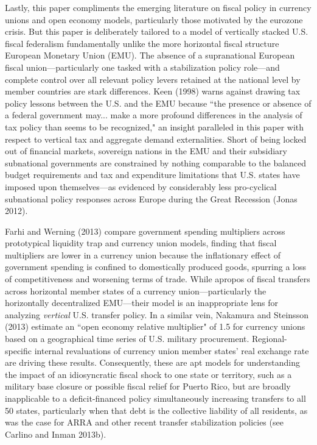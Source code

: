 \documentclass[12pt,letterpaper]{article}
\begin{document}
Lastly, this paper compliments the emerging literature on fiscal policy in currency unions and open economy models, particularly those motivated by the eurozone crisis. But this paper is deliberately tailored to a model of vertically stacked U.S. fiscal federalism fundamentally unlike the more horizontal fiscal structure European Monetary Union (EMU). The absence of a supranational European fiscal union---particularly one tasked with a stabilization policy role---and complete control over all relevant policy levers retained at the national level by member countries are stark differences. Keen (1998) warns against drawing tax policy lessons between the U.S. and the EMU because ``the presence or absence of a federal government may... make a more profound differences in the analysis of tax policy than seems to be recognized," an insight paralleled in this paper with respect to vertical tax and aggregate demand externalities. Short of being locked out of financial markets, sovereign nations in the EMU and their subsidiary subnational governments are constrained by nothing comparable to the balanced budget requirements and tax and expenditure limitations that U.S. states have imposed upon themselves---as evidenced by  considerably less pro-cyclical subnational policy responses across Europe during the Great Recession (Jonas 2012).

Farhi and Werning (2013) compare government spending multipliers across prototypical liquidity trap and currency union models, finding that fiscal multipliers are lower in a currency union because the inflationary effect of government spending is confined to domestically produced goods, spurring a loss of competitiveness and worsening terms of trade. While apropos of fiscal transfers across horizontal member states of a currency union---particularly the horizontally decentralized EMU---their model is an inappropriate lens for analyzing \textit{vertical} U.S. transfer policy. In a similar vein, Nakamura and Steinsson (2013) estimate an ``open economy relative multiplier" of 1.5 for currency unions based on a geographical time series of U.S. military procurement. Regional-specific internal revaluations of currency union member states' real exchange rate are driving these results. Consequently, these are apt models for understanding the impact of an idiosyncratic fiscal shock to one state or territory, such as a military base closure or possible fiscal relief for Puerto Rico, but are broadly inapplicable to a deficit-financed policy simultaneously increasing transfers to all 50 states, particularly when that debt is the collective liability of all residents, as was the case for ARRA and other recent transfer stabilization policies (see Carlino and Inman 2013b). 
\end{document}
